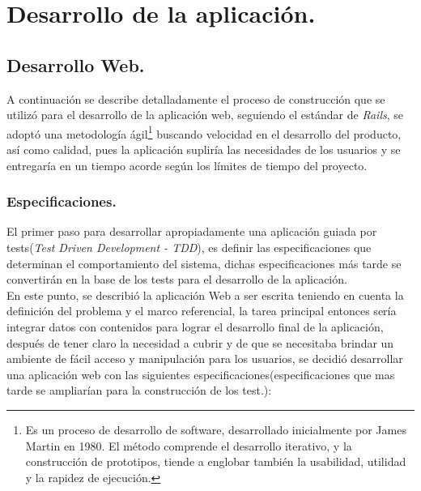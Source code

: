 \chapter{Desarrollo de la aplicación.}

\section{Desarrollo Web.}

A continuación se describe detalladamente el proceso de construcción que se utilizó para el desarrollo de la aplicación web, seguiendo el estándar de \emph{Rails}, se adoptó una metodología ágil\footnote{Es un proceso de desarrollo de software, desarrollado inicialmente por James Martin en 1980. El método comprende el desarrollo iterativo, y la construcción de prototipos, tiende a englobar también la usabilidad, utilidad y la rapidez de ejecución.} buscando velocidad en el desarrollo del producto, así como calidad, pues la aplicación supliría las necesidades de los usuarios y se entregaría en un tiempo acorde según los límites de tiempo del proyecto.

\subsection{Especificaciones.}

El primer paso para desarrollar apropiadamente una aplicación guiada por tests(\emph{Test Driven Development - TDD}), es definir las especificaciones que determinan el comportamiento del sistema, dichas especificaciones más tarde se convertirán en la base de los tests para el desarrollo de la aplicación.\\

En este punto, se describió la aplicación Web a ser escrita teniendo en cuenta la definición del problema y el marco referencial, la tarea principal entonces sería integrar datos con contenidos para lograr el desarrollo final de la aplicación, después de tener claro la necesidad a cubrir y de que se necesitaba brindar un ambiente de fácil acceso y manipulación para los usuarios, se decidió desarrollar una aplicación web con las siguientes especificaciones(especificaciones que mas tarde se ampliarían para la construcción de los test.):


